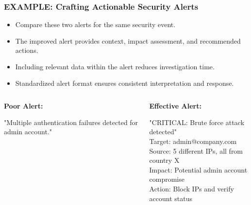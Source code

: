 \documentclass{beamer}
\begin{document}
\begin{frame}
\frametitle{EXAMPLE: Crafting Actionable Security Alerts}
\begin{itemize}
\item Compare these two alerts for the same security event.
\item The improved alert provides context, impact assessment, and recommended actions.
\item Including relevant data within the alert reduces investigation time.
\item Standardized alert format ensures consistent interpretation and response.
\end{itemize}

\begin{columns}[T]
\scriptsize
\begin{column}{0.48\textwidth}
\textbf{Poor Alert:}

"Multiple authentication failures detected for admin account."
\end{column}
\begin{column}{0.48\textwidth}
\textbf{Effective Alert:}

"CRITICAL: Brute force attack detected"\\
Target: admin@company.com\\
Source: 5 different IPs, all from country X\\
Impact: Potential admin account compromise\\
Action: Block IPs and verify account status
\end{column}
\end{columns}
\end{frame}
\end{document}
